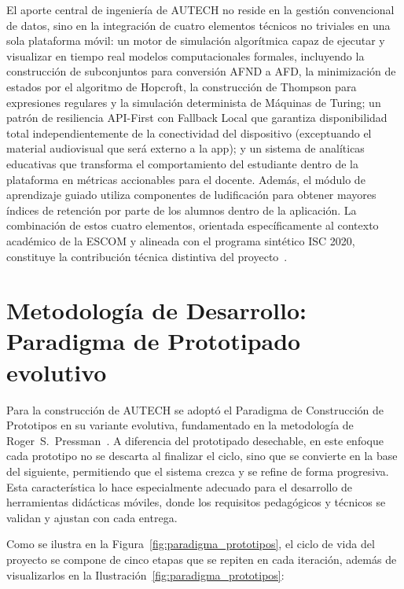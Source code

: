 El aporte central de ingeniería de AUTECH no reside en la gestión convencional de datos, sino
en la integración de cuatro elementos técnicos no triviales en una sola plataforma móvil: un
motor de simulación algorítmica capaz de ejecutar y visualizar en tiempo real modelos
computacionales formales, incluyendo la construcción de subconjuntos para conversión AFND a
AFD, la minimización de estados por el algoritmo de Hopcroft, la construcción de Thompson para
expresiones regulares y la simulación determinista de Máquinas de Turing; un patrón de
resiliencia API-First con Fallback Local que garantiza disponibilidad total independientemente
de la conectividad del dispositivo (exceptuando el material audiovisual que será externo a la
app); y un sistema de analíticas educativas que transforma el comportamiento del estudiante
dentro de la plataforma en métricas accionables para el docente. Además, el módulo de
aprendizaje guiado utiliza componentes de ludificación para obtener mayores índices de
retención por parte de los alumnos dentro de la aplicación. La combinación de estos cuatro
elementos, orientada específicamente al contexto académico de la ESCOM y alineada con el
programa sintético ISC 2020, constituye la contribución técnica distintiva del
proyecto~\cite{hopcroft2007, pressman2020, flame2024}.

\newpage
\section{Metodología de Desarrollo: Paradigma de Prototipado evolutivo}
\label{sec:metodologia}

Para la construcción de AUTECH se adoptó el Paradigma de Construcción de Prototipos en su
variante evolutiva, fundamentado en la metodología de Roger~S.\ Pressman~\cite{pressman2010}.
A diferencia del prototipado desechable, en este enfoque cada prototipo no se descarta al
finalizar el ciclo, sino que se convierte en la base del siguiente, permitiendo que el sistema
crezca y se refine de forma progresiva. Esta característica lo hace especialmente adecuado para
el desarrollo de herramientas didácticas móviles, donde los requisitos pedagógicos y técnicos
se validan y ajustan con cada entrega.

Como se ilustra en la Figura~\ref{fig:paradigma_prototipos}, el ciclo de vida del proyecto se
compone de cinco etapas que se repiten en cada iteración, además de visualizarlos en la
Ilustración~\ref{fig:paradigma_prototipos}:

